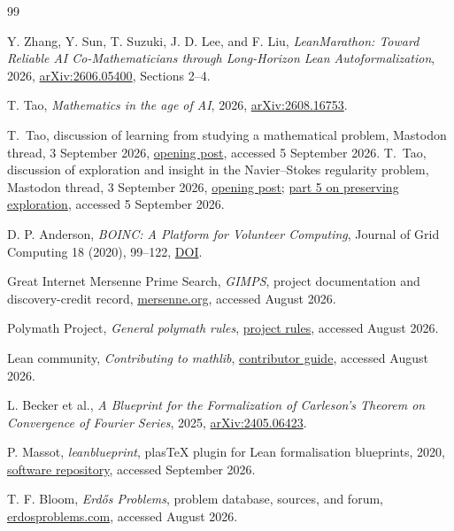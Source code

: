 \documentclass[10pt]{article}
\begin{document}
\begin{thebibliography}{99}

Y. Zhang, Y. Sun, T. Suzuki, J. D. Lee, and F. Liu,
\emph{LeanMarathon: Toward Reliable AI Co-Mathematicians through Long-Horizon
Lean Autoformalization}, 2026,
\href{https://arxiv.org/abs/2606.05400}{arXiv:2606.05400}, Sections 2--4.


T. Tao, \emph{Mathematics in the age of AI}, 2026,
\href{https://arxiv.org/abs/2608.16753}{arXiv:2608.16753}.

T.~Tao, discussion of learning from studying a mathematical problem,
Mastodon thread, 3 September 2026,
\href{https://mathstodon.xyz/@tao/117208617602946453}{opening post},
accessed 5 September 2026.
T.~Tao, discussion of exploration and insight in the Navier--Stokes
regularity problem, Mastodon thread, 3 September 2026,
\href{https://mathstodon.xyz/@tao/117207849921390904}{opening post};
\href{https://mathstodon.xyz/@tao/117207855800042681}{part 5 on preserving exploration},
accessed 5 September 2026.

D. P. Anderson, \emph{BOINC: A Platform for Volunteer Computing}, Journal of
Grid Computing 18 (2020), 99--122,
\href{https://doi.org/10.1007/s10723-019-09497-9}{DOI}.

Great Internet Mersenne Prime Search, \emph{GIMPS}, project documentation and
discovery-credit record, \href{https://www.mersenne.org/}{mersenne.org},
accessed August 2026.

Polymath Project, \emph{General polymath rules},
\href{https://polymathprojects.org/general-polymath-rules/}{project rules},
accessed August 2026.

Lean community, \emph{Contributing to mathlib},
\href{https://leanprover-community.github.io/contribute/index.html}{contributor guide},
accessed August 2026.

L. Becker et al., \emph{A Blueprint for the Formalization of Carleson's
Theorem on Convergence of Fourier Series}, 2025,
\href{https://arxiv.org/abs/2405.06423}{arXiv:2405.06423}.

P. Massot, \emph{leanblueprint}, plasTeX plugin for Lean formalisation
blueprints, 2020,
\href{https://github.com/PatrickMassot/leanblueprint}{software repository},
accessed September 2026.

T. F. Bloom, \emph{Erd\H{o}s Problems}, problem database, sources, and forum,
\href{https://www.erdosproblems.com/}{erdosproblems.com},
accessed August 2026.


\end{thebibliography}
\end{document}
